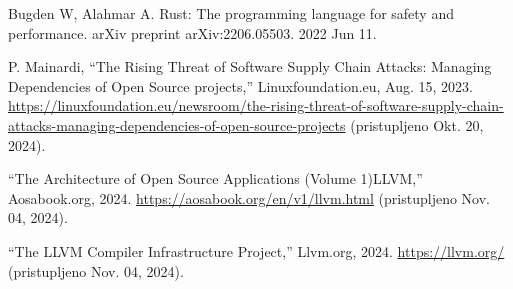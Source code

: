 \begin{thebibliography}
    Bugden W, Alahmar A. Rust: The programming language for safety and performance. arXiv preprint arXiv:2206.05503. 2022 Jun 11.

    P. Mainardi, “The Rising Threat of Software Supply Chain Attacks: Managing Dependencies of Open Source projects,” Linuxfoundation.eu, Aug. 15, 2023.
    \url{https://linuxfoundation.eu/newsroom/the-rising-threat-of-software-supply-chain-attacks-managing-dependencies-of-open-source-projects} (pristupljeno Okt. 20, 2024).

    “The Architecture of Open Source Applications (Volume 1)LLVM,” Aosabook.org, 2024. 
    \url{https://aosabook.org/en/v1/llvm.html} (pristupljeno Nov. 04, 2024).

    “The LLVM Compiler Infrastructure Project,” Llvm.org, 2024. 
    \url{https://llvm.org/} (pristupljeno Nov. 04, 2024).
\end{thebibliography}